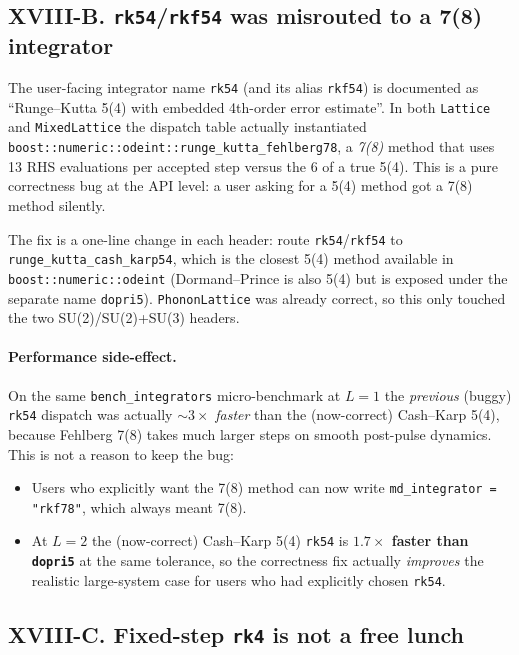 \documentclass[11pt,letterpaper]{article}
\begin{document}
\subsection*{XVIII-B.  \texttt{rk54}/\texttt{rkf54} was misrouted
to a 7(8) integrator}

The user-facing integrator name \texttt{rk54} (and its alias
\texttt{rkf54}) is documented as ``Runge--Kutta 5(4) with embedded
4th-order error estimate''.  In both \texttt{Lattice} and
\texttt{MixedLattice} the dispatch table actually instantiated
\texttt{boost::numeric::odeint::runge\_kutta\_fehlberg78}, a
\emph{7(8)} method that uses 13 RHS evaluations per accepted step
versus the 6 of a true 5(4).  This is a pure correctness bug at
the API level: a user asking for a 5(4) method got a 7(8) method
silently.

The fix is a one-line change in each header: route
\texttt{rk54}/\texttt{rkf54} to
\texttt{runge\_kutta\_cash\_karp54}, which is the closest 5(4)
method available in \texttt{boost::numeric::odeint} (Dormand--Prince
is also 5(4) but is exposed under the separate name
\texttt{dopri5}).  \texttt{PhononLattice} was already correct, so
this only touched the two SU(2)/SU(2)+SU(3) headers.

\paragraph{Performance side-effect.}  On the same
\texttt{bench\_integrators} micro-benchmark at $L = 1$ the
\emph{previous} (buggy) \texttt{rk54} dispatch was actually
$\sim 3\times$ \emph{faster} than the (now-correct) Cash--Karp
5(4), because Fehlberg 7(8) takes much larger steps on smooth
post-pulse dynamics.  This is not a reason to keep the bug:
\begin{itemize}
  \item Users who explicitly want the 7(8) method can now write
        \texttt{md\_integrator = "rkf78"}, which always meant 7(8).
  \item At $L = 2$ the (now-correct) Cash--Karp 5(4)
        \texttt{rk54} is \textbf{$\mathbf{1.7\times}$ faster than
        \texttt{dopri5}} at the same tolerance, so the
        correctness fix actually \emph{improves} the realistic
        large-system case for users who had explicitly chosen
        \texttt{rk54}.
\end{itemize}

\subsection*{XVIII-C.  Fixed-step \texttt{rk4} is not a free lunch}
\end{document}
